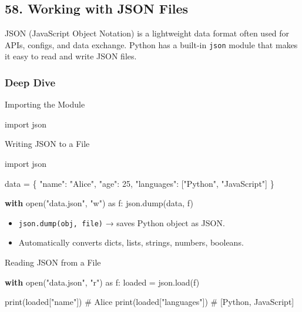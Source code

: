 \documentclass[
  letterpaper,
  DIV=11,
  numbers=noendperiod]{scrreprt}
\newenvironment{Shaded}{\begin{snugshade}}{\end{snugshade}}
\newcommand{\BuiltInTok}[1]{\textcolor[rgb]{0.00,0.23,0.31}{#1}}
\newcommand{\CommentTok}[1]{\textcolor[rgb]{0.37,0.37,0.37}{#1}}
\newcommand{\ControlFlowTok}[1]{\textcolor[rgb]{0.00,0.23,0.31}{\textbf{#1}}}
\newcommand{\DecValTok}[1]{\textcolor[rgb]{0.68,0.00,0.00}{#1}}
\newcommand{\ImportTok}[1]{\textcolor[rgb]{0.00,0.46,0.62}{#1}}
\newcommand{\NormalTok}[1]{\textcolor[rgb]{0.00,0.23,0.31}{#1}}
\newcommand{\OperatorTok}[1]{\textcolor[rgb]{0.37,0.37,0.37}{#1}}
\newcommand{\StringTok}[1]{\textcolor[rgb]{0.13,0.47,0.30}{#1}}
\providecommand{\tightlist}{%
  \setlength{\itemsep}{0pt}\setlength{\parskip}{0pt}}
\begin{document}
\subsection{58. Working with JSON Files}\label{working-with-json-files}

JSON (JavaScript Object Notation) is a lightweight data format often
used for APIs, configs, and data exchange. Python has a built-in
\texttt{json} module that makes it easy to read and write JSON files.

\subsubsection{Deep Dive}\label{deep-dive-57}

Importing the Module

\begin{Shaded}
\begin{Highlighting}[]
\ImportTok{import}\NormalTok{ json}
\end{Highlighting}
\end{Shaded}

Writing JSON to a File

\begin{Shaded}
\begin{Highlighting}[]
\ImportTok{import}\NormalTok{ json}

\NormalTok{data }\OperatorTok{=}\NormalTok{ \{}
    \StringTok{"name"}\NormalTok{: }\StringTok{"Alice"}\NormalTok{,}
    \StringTok{"age"}\NormalTok{: }\DecValTok{25}\NormalTok{,}
    \StringTok{"languages"}\NormalTok{: [}\StringTok{"Python"}\NormalTok{, }\StringTok{"JavaScript"}\NormalTok{]}
\NormalTok{\}}

\ControlFlowTok{with} \BuiltInTok{open}\NormalTok{(}\StringTok{"data.json"}\NormalTok{, }\StringTok{"w"}\NormalTok{) }\ImportTok{as}\NormalTok{ f:}
\NormalTok{    json.dump(data, f)}
\end{Highlighting}
\end{Shaded}

\begin{itemize}
\tightlist
\item
  \texttt{json.dump(obj,\ file)} → saves Python object as JSON.
\item
  Automatically converts dicts, lists, strings, numbers, booleans.
\end{itemize}

Reading JSON from a File

\begin{Shaded}
\begin{Highlighting}[]
\ControlFlowTok{with} \BuiltInTok{open}\NormalTok{(}\StringTok{"data.json"}\NormalTok{, }\StringTok{"r"}\NormalTok{) }\ImportTok{as}\NormalTok{ f:}
\NormalTok{    loaded }\OperatorTok{=}\NormalTok{ json.load(f)}

\BuiltInTok{print}\NormalTok{(loaded[}\StringTok{"name"}\NormalTok{])   }\CommentTok{\# Alice}
\BuiltInTok{print}\NormalTok{(loaded[}\StringTok{"languages"}\NormalTok{])  }\CommentTok{\# [\textquotesingle{}Python\textquotesingle{}, \textquotesingle{}JavaScript\textquotesingle{}]}
\end{Highlighting}
\end{Shaded}
\end{document}
